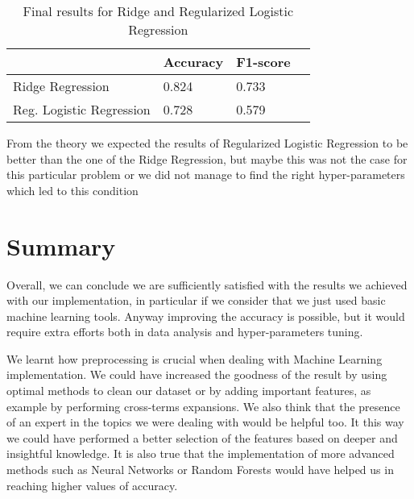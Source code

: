\documentclass[10pt,article]{IEEEtran}
\begin{document}
\begin{table}[!h]
\centering
\label{tab:finalresults}
\begin{tabular}{l|l|l|l}
\cline{2-3}
                                                 & Accuracy & F1-score          \\ 
\hline
\multicolumn{1}{|l|}{Ridge Regression}                     & 0.824     & 0.733             \\ 
\cline{1-1}
\multicolumn{1}{|l|}{Reg. Logistic Regression}  & 0.728          & 0.579                 \\
\hline
\end{tabular}
\caption{Final results for Ridge and Regularized Logistic Regression }
\vspace{-0.5cm}
\end{table}

From the theory we expected the results of Regularized Logistic Regression to be better than the one of the Ridge Regression, but maybe this was not the case for this particular problem or we did not manage to find the right hyper-parameters which led to this condition


\section{Summary}

Overall, we can conclude we are sufficiently satisfied with the results we achieved with our implementation, in particular if we consider that we just used basic machine learning tools. Anyway improving the accuracy is possible, but it would require extra efforts both in data analysis and hyper-parameters tuning. 

We learnt how preprocessing is crucial when dealing with Machine Learning implementation. We could have increased the goodness of the result by using optimal methods to clean our dataset or by adding important features, as example by performing cross-terms expansions. We also think that the presence of an expert in the topics we were dealing with would be helpful too. It this way we could have performed a better selection of the features based on deeper and insightful knowledge. It is also true that the implementation of more advanced methods such as Neural Networks or Random Forests would have helped us in reaching higher values of accuracy.




\end{document}
